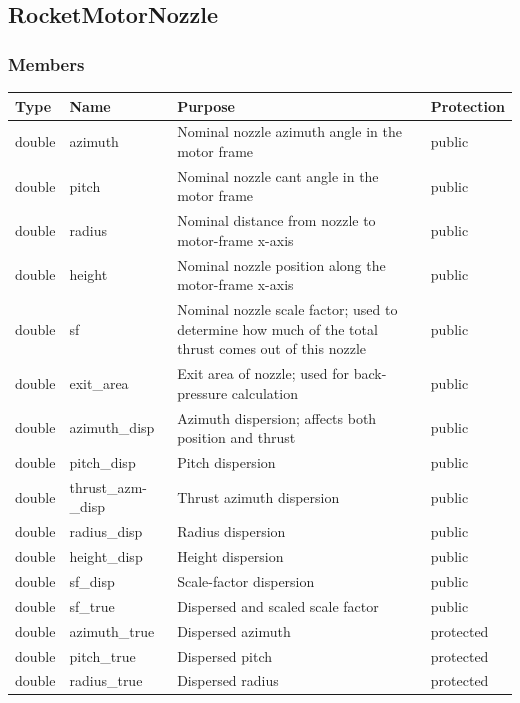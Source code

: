 \documentclass[11pt,fleqn]{report}
\begin{document}
\subsection{RocketMotorNozzle}
\subsubsection{Members}
\begin{center}
\begin{longtable}{|p{2.75cm}|p{2.8cm}|p{7.1cm}|l|} \hline
\textbf{Type} & \textbf{Name} & \textbf{Purpose} & \textbf{Protection} \\
\hline
\endhead
double & azimuth & Nominal nozzle azimuth angle in the motor frame & public \\ 
\hline
double & pitch & Nominal nozzle cant angle in the motor frame & public \\
\hline
double & radius & Nominal distance from nozzle to motor-frame x-axis & public \\
\hline
double & height & Nominal nozzle position along the motor-frame x-axis & public \\
\hline
double & sf & Nominal nozzle scale factor; used to determine how much of the total thrust comes out of this nozzle & public \\
\hline
double & exit\_area & Exit area of nozzle; used for back-pressure calculation & public \\
\hline
double & azimuth\_disp & Azimuth dispersion; affects both position and thrust & public \\
\hline
double & pitch\_disp & Pitch dispersion & public \\
\hline
double & thrust\_azm-\newline \_disp & Thrust azimuth dispersion & public \\
\hline
double & radius\_disp & Radius dispersion & public \\
\hline
double & height\_disp & Height dispersion & public \\
\hline
double & sf\_disp & Scale-factor dispersion & public \\
\hline
double & sf\_true & Dispersed and scaled scale factor & public \\
\hline
double & azimuth\_true & Dispersed azimuth & protected \\
\hline
double & pitch\_true & Dispersed pitch & protected \\
\hline
double & radius\_true & Dispersed radius & protected \\
\hline

\end{longtable}
\end{center}
\end{document}
